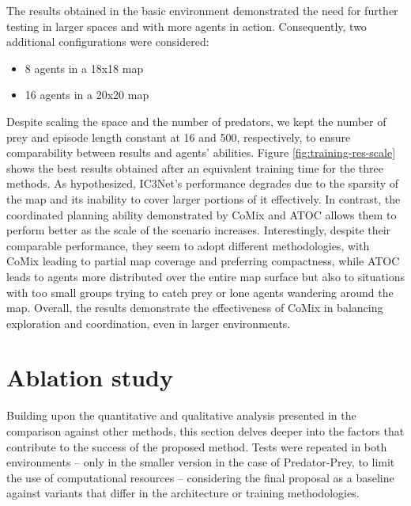 \documentclass[a4paper,singleside,12pt]{report} %
\begin{document}
The results obtained in the basic environment demonstrated the need for further testing in larger spaces and with more agents in action. Consequently, two additional configurations were considered:
\begin{itemize}
  \item 8 agents in a 18x18 map
  \item 16 agents in a 20x20 map
\end{itemize}
Despite scaling the space and the number of predators, we kept the number of prey and episode length constant at 16 and 500, respectively, to ensure comparability between results and agents' abilities. Figure \ref*{fig:training-res-scale} shows the best results obtained after an equivalent training time for the three methods. As hypothesized, IC3Net's performance degrades due to the sparsity of the map and its inability to cover larger portions of it effectively. In contrast, the coordinated planning ability demonstrated by CoMix and ATOC allows them to perform better as the scale of the scenario increases. Interestingly, despite their comparable performance, they seem to adopt different methodologies, with CoMix leading to partial map coverage and preferring compactness, while ATOC leads to agents more distributed over the entire map surface but also to situations with too small groups trying to catch prey or lone agents wandering around the map. Overall, the results demonstrate the effectiveness of CoMix in balancing exploration and coordination, even in larger environments.


\section{Ablation study}\label{ablation}

Building upon the quantitative and qualitative analysis presented in the comparison against other methods, this section delves deeper into the factors that contribute to the success of the proposed method. Tests were repeated in both environments -- only in the smaller version in the case of Predator-Prey, to limit the use of computational resources -- considering the final proposal as a baseline against variants that differ in the architecture or training methodologies.
\end{document}
